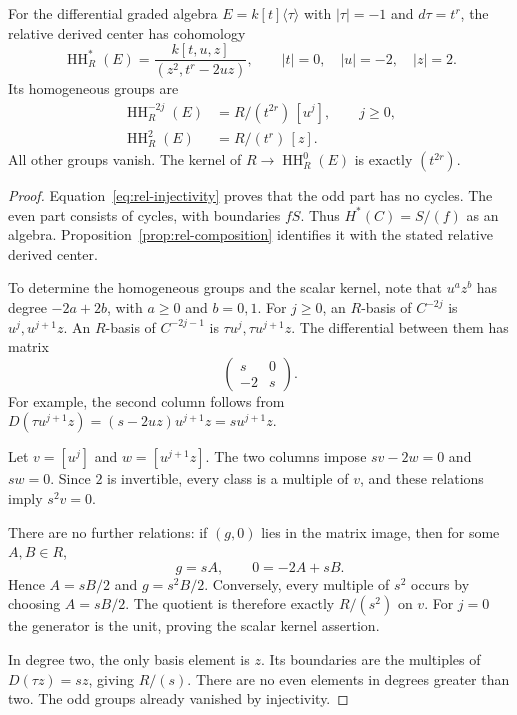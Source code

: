 \begin{theorem}\label{thm:rel-full-center}
For the differential graded algebra
$E=k[t]\langle\tau\rangle$ with $|\tau|=-1$ and $d\tau=t^r$,
the relative derived center has cohomology
\begin{equation}\label{eq:rel-center-ring}
 \operatorname{HH}_R^*(E)
  =\frac{k[t,u,z]}{(z^2,t^r-2uz)},
 \qquad |t|=0,\quad |u|=-2,\quad |z|=2.
\end{equation}
Its homogeneous groups are
\[
 \begin{split}
 \operatorname{HH}_R^{-2j}(E)&=R/(t^{2r})\,[u^j],\qquad j\geq0,\\
 \operatorname{HH}_R^2(E)&=R/(t^r)\,[z].
 \end{split}
\]
All other groups vanish. The kernel of $R\to\operatorname{HH}_R^0(E)$
is exactly $(t^{2r})$.
\end{theorem}

\begin{proof}
Equation~\eqref{eq:rel-injectivity} proves that the odd part has no
cycles. The even part consists of cycles, with boundaries $fS$.
Thus $H^*(C)=S/(f)$ as an algebra.
Proposition~\ref{prop:rel-composition} identifies it with the stated
relative derived center.

To determine the homogeneous groups and the scalar kernel, note that
$u^a z^b$ has degree $-2a+2b$, with $a\geq0$ and $b=0,1$.
For $j\geq0$, an $R$-basis of $C^{-2j}$ is
$u^j,u^{j+1}z$. An $R$-basis of $C^{-2j-1}$ is
$\tau u^j,\tau u^{j+1}z$.
The differential between them has matrix
\begin{equation}\label{eq:rel-scalar-matrix}
 \begin{pmatrix}s&0\\-2&s\end{pmatrix}.
\end{equation}
For example, the second column follows from
$D(\tau u^{j+1}z)=(s-2uz)u^{j+1}z=su^{j+1}z$.

Let $v=[u^j]$ and $w=[u^{j+1}z]$.
The two columns impose $sv-2w=0$ and $sw=0$.
Since $2$ is invertible, every class is a multiple of $v$, and these
relations imply $s^2v=0$.

There are no further relations: if $(g,0)$ lies in the matrix image, then
for some $A,B\in R$,
\[
 g=sA,\qquad 0=-2A+sB.
\]
Hence $A=sB/2$ and $g=s^2B/2$.
Conversely, every multiple of $s^2$ occurs by choosing $A=sB/2$.
The quotient is therefore exactly $R/(s^2)$ on $v$.
For $j=0$ the generator is the unit, proving the scalar kernel assertion.

In degree two, the only basis element is $z$.
Its boundaries are the multiples of $D(\tau z)=sz$, giving $R/(s)$.
There are no even elements in degrees greater than two.
The odd groups already vanished by injectivity.
\end{proof}

